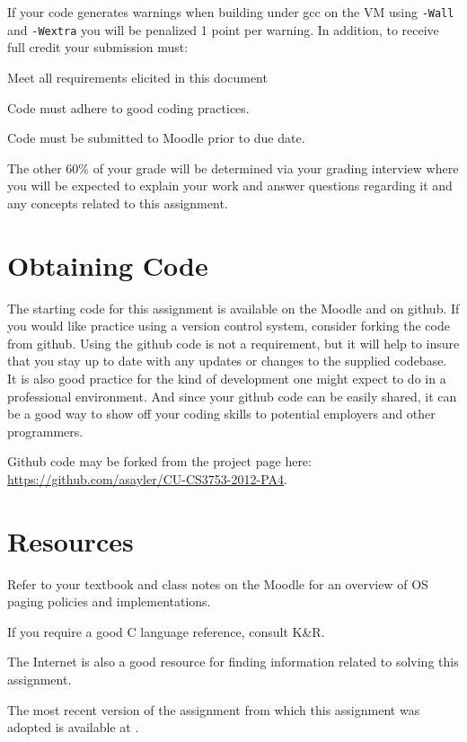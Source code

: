 \documentclass[12pt]{article}
\newenvironment{packed_item}{
\begin{itemize}
  \setlength{\itemsep}{1pt}
  \setlength{\parskip}{0pt}
  \setlength{\parsep}{0pt}
}{\end{itemize}}
\begin{document}
If your code generates warnings when building under gcc on the VM
using \texttt{-Wall} and \texttt{-Wextra} you will be penalized 1
point per warning. In addition, to receive full credit your submission must:
\begin{packed_item}
\item Meet all requirements elicited in this document
\item Code must adhere to good coding practices.
\item Code must be submitted to Moodle prior to due date.
\end{packed_item}

The other 60\% of your grade will be determined via your grading
interview where you will be expected to explain your work and answer
questions regarding it and any concepts related to this assignment.

\section{Obtaining Code}
The starting code for this assignment is available on the Moodle and
on github. If you would like practice using a version control system,
consider forking the code from github. Using the github code is not
a requirement, but it will help to insure that you stay up to date
with any updates or changes to the supplied codebase. It is also
good practice for the kind of development one might expect to do in
a professional environment. And since your github code can be easily
shared, it can be a good way to show off your coding skills to
potential employers and other programmers.

Github code may be forked from the project page here:\\
\url{https://github.com/asayler/CU-CS3753-2012-PA4}.

\section{Resources}
Refer to your textbook and class notes on the Moodle for an overview
of OS paging policies and implementations.

If you require a good C language reference, consult K\&R\cite{K+R}.

The Internet\cite{tubes} is also a good resource for finding
information related to solving this assignment.

The most recent version of the assignment from which this assignment
was adopted is available at \cite{couch-a5}.
\end{document}
